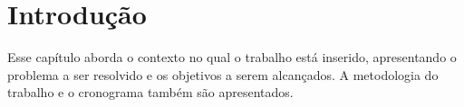 \chapter[Introdução]{Introdução}

Esse capítulo aborda o contexto no qual o trabalho está inserido, apresentando o
problema a ser resolvido e os objetivos a serem alcançados. A metodologia do trabalho e o
cronograma também são apresentados.








